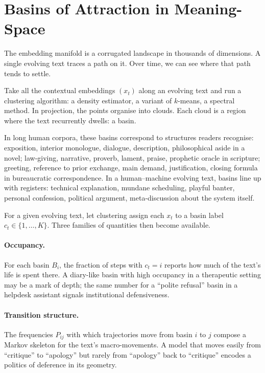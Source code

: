 \documentclass[12pt,a4paper]{article}
\begin{document}
\section{Basins of Attraction in Meaning-Space}

The embedding manifold is a corrugated landscape in thousands of dimensions. A single evolving text traces a path on it. Over time, we can see where that path tends to settle.

Take all the contextual embeddings $(x_t)$ along an evolving text and run a clustering algorithm: a density estimator, a variant of $k$-means, a spectral method. In projection, the points organise into clouds. Each cloud is a region where the text recurrently dwells: a basin.

In long human corpora, these basins correspond to structures readers recognise: exposition, interior monologue, dialogue, description, philosophical aside in a novel; law-giving, narrative, proverb, lament, praise, prophetic oracle in scripture; greeting, reference to prior exchange, main demand, justification, closing formula in bureaucratic correspondence. In a human--machine evolving text, basins line up with registers: technical explanation, mundane scheduling, playful banter, personal confession, political argument, meta-discussion about the system itself.

For a given evolving text, let clustering assign each $x_t$ to a basin label $c_t \in \{1,\dots,K\}$. Three families of quantities then become available.

\paragraph{Occupancy.} For each basin $B_i$, the fraction of steps with $c_t = i$ reports how much of the text's life is spent there. A diary-like basin with high occupancy in a therapeutic setting may be a mark of depth; the same number for a ``polite refusal'' basin in a helpdesk assistant signals institutional defensiveness.

\paragraph{Transition structure.} The frequencies $P_{ij}$ with which trajectories move from basin $i$ to $j$ compose a Markov skeleton for the text's macro-movements. A model that moves easily from ``critique'' to ``apology'' but rarely from ``apology'' back to ``critique'' encodes a politics of deference in its geometry.
\end{document}
